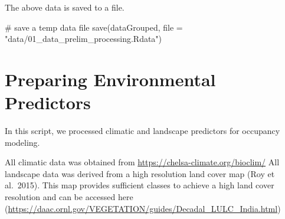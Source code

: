 \documentclass[
]{article}
\newenvironment{Shaded}{}{}
\newcommand{\CommentTok}[1]{\textcolor[rgb]{0.00,0.50,0.00}{#1}}
\newcommand{\ControlFlowTok}[1]{\textcolor[rgb]{0.00,0.00,1.00}{#1}}
\newcommand{\DataTypeTok}[1]{#1}
\newcommand{\DecValTok}[1]{#1}
\newcommand{\KeywordTok}[1]{\textcolor[rgb]{0.00,0.00,1.00}{#1}}
\newcommand{\NormalTok}[1]{#1}
\newcommand{\OperatorTok}[1]{#1}
\newcommand{\OtherTok}[1]{\textcolor[rgb]{1.00,0.25,0.00}{#1}}
\newcommand{\StringTok}[1]{\textcolor[rgb]{0.00,0.50,0.50}{#1}}
\begin{document}
\begin{Shaded}
\end{Shaded}

The above data is saved to a file.

\begin{Shaded}
\begin{Highlighting}[]
\CommentTok{# save a temp data file}
\KeywordTok{save}\NormalTok{(dataGrouped, }\DataTypeTok{file =} \StringTok{"data/01_data_prelim_processing.Rdata"}\NormalTok{)}
\end{Highlighting}
\end{Shaded}

\hypertarget{preparing-environmental-predictors}{%
\section{Preparing Environmental Predictors}\label{preparing-environmental-predictors}}

In this script, we processed climatic and landscape predictors for occupancy modeling.

All climatic data was obtained from \url{https://chelsa-climate.org/bioclim/}
All landscape data was derived from a high resolution land cover map (Roy et al.~2015). This map provides sufficient classes to achieve a high land cover resolution and can be accessed here (\url{https://daac.ornl.gov/VEGETATION/guides/Decadal_LULC_India.html})
\end{document}
